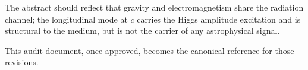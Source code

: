 \documentclass[11pt,a4paper]{article}
\begin{document}
\begin{enumerate}
      The abstract should reflect that gravity and electromagnetism
      share the radiation channel; the longitudinal mode at $c$
      carries the Higgs amplitude excitation and is structural to the
      medium, but is not the carrier of any astrophysical signal.
\end{enumerate}

This audit document, once approved, becomes the canonical reference for
those revisions.
\end{document}

